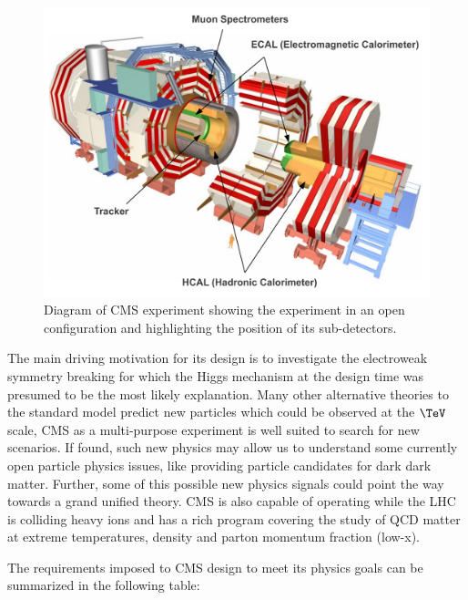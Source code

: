 \begin{figure}[!htb]
  \centering
  \includegraphics[width=1.00\textwidth]{Chapter02/CMS/Images/CMS_Layout_Diagram.pdf}
  \caption{Diagram of \gls{CMS} experiment showing the experiment in an open configuration and highlighting the position of its sub-detectors.}
  \label{FIGURE:ExperimentalApparatus_CMS_Layout_Diagram}
\end{figure}

The main driving motivation for its design is to investigate the electroweak symmetry breaking for which the Higgs mechanism at the design time was presumed to be the most likely explanation. Many other alternative theories to the standard model predict new particles which could be observed at the $\TeV$ scale, \gls{CMS} as a multi-purpose experiment is well suited to search for new scenarios. If found, such new physics may allow us to understand some currently open particle physics issues, like providing particle candidates for dark dark matter. Further, some of this possible new physics signals could point the way towards a grand unified theory. \gls{CMS} is also capable of operating while the \gls{LHC} is colliding heavy ions and has a rich program covering the study of \gls{QCD} matter at extreme temperatures, density and parton momentum fraction (low-x).

The requirements imposed to \gls{CMS} design to meet its physics goals can be summarized in the following table\cite{ARTICLE:TheCMSExperiment}:

